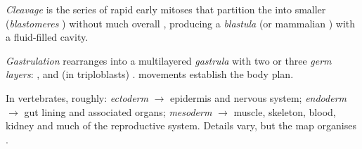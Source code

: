 \begin{definition}[Cleavage]\label{def:g12:reproduction-development:cleavage}
\emph{Cleavage} is the series of rapid early mitoses that
partition the  into smaller  (\emph{blastomeres}
) without much overall , producing a
\emph{blastula} (or mammalian ) with a fluid-filled
cavity.
\end{definition}

\begin{definition}[Gastrulation]
\label{def:g12:reproduction-development:gastrulation}
\emph{Gastrulation} rearranges   into a
multilayered \emph{gastrula} with two or three
\emph{germ layers}: ,  and (in
triploblasts) .  movements establish the body plan.
\end{definition}

\begin{proposition}
\label{prop:g12:reproduction-development:layers}
In vertebrates, roughly: \emph{ectoderm} $\to$ epidermis
and nervous system; \emph{endoderm} $\to$ gut lining and
associated organs; \emph{mesoderm} $\to$ muscle, skeleton,
blood, kidney and much of the reproductive system. Details vary, but the
map organises .
\end{proposition}
\admitted

